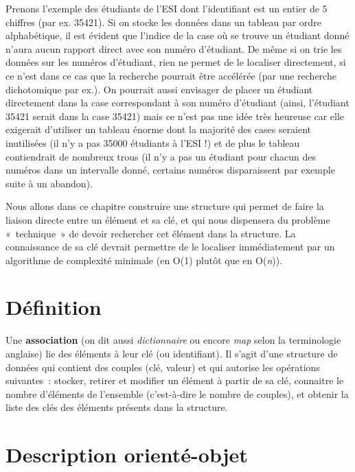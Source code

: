 	Prenons l'exemple des étudiants de l'ESI dont l'identifiant 
	est un entier de 5 chiffres (par ex. 35421). Si on stocke
	les données dans un tableau par ordre alphabétique, il est 
	évident que l'indice de la case où se trouve un étudiant
	donné n'aura aucun rapport direct avec son numéro d'étudiant. 
	De même si on trie les données sur les numéros
	d'étudiant, rien ne permet de le localiser directement, 
	si ce n'est dans ce cas que la recherche pourrait être
	accélérée (par une recherche dichotomique par ex.). 
	On pourrait aussi envisager de placer un étudiant directement dans
	la case correspondant à son numéro d'étudiant (ainsi, l'étudiant 35421 
	serait dans la case 35421) mais ce n'est pas une
	idée très heureuse car elle exigerait d'utiliser un tableau 
	énorme dont la majorité des cases seraient inutilisées (il
	n'y a pas 35000 étudiants à l'ESI !) et de plus le tableau 
	contiendrait de nombreux trous (il n'y a pas un étudiant
	pour chacun des numéros dans un intervalle donné, certains 
	numéros disparaissent par exemple suite à un abandon).

	Nous allons dans ce chapitre construire une structure qui 
	permet de faire la liaison directe entre un élément et sa clé,
	et qui nous dispensera du problème «~technique~» de devoir 
	rechercher cet élément dans la structure. La connaissance de
	sa clé devrait permettre de le localiser immédiatement par 
	un algorithme de complexité minimale (en O(1) plutôt que en
	O(\textit{n})).


\section{Définition}

	Une \textbf{association} (on dit aussi \textit{dictionnaire} 
	ou encore \textit{map} selon la terminologie anglaise) lie
	des éléments à leur clé (ou identifiant). Il s'agit d'une 
	structure de données qui contient des couples (clé, valeur)
	et qui autorise les opérations suivantes~: stocker, retirer 
	et modifier un élément à partir de sa clé, connaitre le
	nombre d'éléments de l'ensemble (c'est-à-dire le nombre de 
	couples), et obtenir la liste des clés des éléments présents
	dans la structure.
	

\section{Description orienté-objet}


